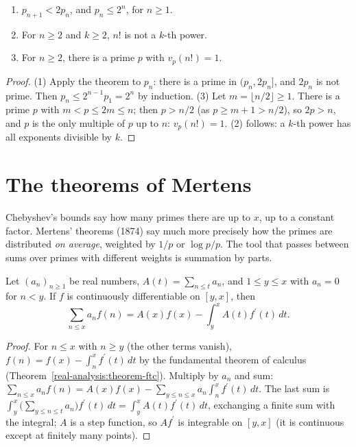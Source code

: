 \begin{corollary}\label{prime-numbers:corollary-bertrand}
\begin{enumerate}
\item $p_{n+1} < 2p_n$, and $p_n \leq 2^n$, for $n \geq 1$.
\item For $n \geq 2$ and $k \geq 2$, $n!$ is not a $k$-th power.
\item For $n \geq 2$, there is a prime $p$ with $v_p(n!) = 1$.
\end{enumerate}
\end{corollary}

\begin{proof}
(1) Apply the theorem to $p_n$: there is a prime in $(p_n, 2p_n]$, and $2p_n$ is not prime. Then $p_n \leq 2^{n-1}p_1 = 2^n$ by induction.
(3) Let $m = \lfloor n/2\rfloor \geq 1$. There is a prime $p$ with $m < p \leq 2m \leq n$; then $p > n/2$ (as $p \geq m + 1 > n/2$), so $2p > n$, and $p$ is the only multiple of $p$ up to $n$:
$v_p(n!) = 1$. (2) follows: a $k$-th power has all exponents divisible by $k$.
\end{proof}

\section{The theorems of Mertens}\label{prime-numbers:section-mertens}

Chebyshev's bounds say how many primes there are up to $x$, up to a constant factor. Mertens' theorems (1874) say much more precisely how the primes are distributed \emph{on average},
weighted by $1/p$ or $\log p/p$. The tool that passes between sums over primes with different weights is summation by parts.

\begin{lemma}\label{prime-numbers:lemma-abel-summation}
Let $(a_n)_{n \geq 1}$ be real numbers, $A(t) = \sum_{n \leq t}a_n$, and $1 \leq y \leq x$ with $a_n = 0$ for $n < y$. If $f$ is continuously differentiable on $[y, x]$, then
\[
\sum_{n \leq x}a_nf(n) = A(x)f(x) - \int_y^xA(t)f^{\prime}(t)\,dt.
\]
\end{lemma}

\begin{proof}
For $n \leq x$ with $n \geq y$ (the other terms vanish), $f(n) = f(x) - \int_n^xf^{\prime}(t)\,dt$ by the fundamental theorem of calculus (Theorem~\ref{real-analysis:theorem-ftc}). Multiply by
$a_n$ and sum: $\sum_{n \leq x}a_nf(n) = A(x)f(x) - \sum_{y \leq n \leq x}a_n\int_n^xf^{\prime}(t)\,dt$. The last sum is $\int_y^x\bigl(\sum_{y \leq n \leq t}a_n\bigr)f^{\prime}(t)\,dt = \int_y^xA(t)f^{\prime}(t)\,dt$,
exchanging a finite sum with the integral; $A$ is a step function, so $Af^{\prime}$ is integrable on $[y, x]$ (it is continuous except at finitely many points).
\end{proof}

